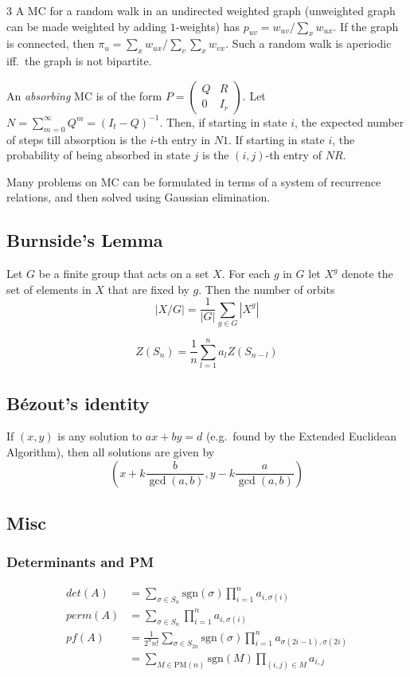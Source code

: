 \documentclass[a4paper, 8pt, landscape, oneside]{extarticle}
\begin{document}
\begin{multicols*}{3}
          A MC for a random walk in an undirected weighted graph (unweighted
          graph can be made weighted by adding $1$-weights) has $p_{uv} =
          w_{uv}/\sum_{x} w_{ux}$. If the graph is connected, then $\pi_u =
          \sum_{x} w_{ux} / \sum_{v}\sum_{x} w_{vx}$. Such a random walk is
          aperiodic iff.\ the graph is not bipartite.
      
          An \textit{absorbing} MC is of the form $P = \left(\begin{matrix} Q & R
          \\ 0 & I_r \end{matrix}\right)$. Let $N = \sum_{m=0}^\infty Q^m = (I_t
          - Q)^{-1}$. Then, if starting in state $i$, the expected number of
          steps till absorption is the $i$-th entry in $N1$. If starting in state
          $i$, the probability of being absorbed in state $j$ is the $(i,j)$-th
          entry of $NR$.
      
          Many problems on MC can be formulated in terms of a system of
          recurrence relations, and then solved using Gaussian elimination.
      
        \subsection{Burnside's Lemma}
          Let $G$ be a finite group that acts on a set $X$. For each $g$ in $G$
          let $X^g$ denote the set of elements in $X$ that are fixed by $g$. Then
          the number of orbits \[ |X/G| = \frac{1}{|G|} \sum_{g\in G} |X^g| \]
      
          \[
              Z(S_n) = \frac{1}{n} \sum_{l=1}^n a_l Z(S_{n-l})
          \]
      
        \subsection{Bézout's identity}
          If $(x,y)$ is any solution to $ax+by=d$ (e.g.\ found by the Extended
          Euclidean Algorithm), then all solutions are given by \[
          \left(x+k\frac{b}{\gcd(a,b)}, y-k\frac{a}{\gcd(a,b)}\right) \]
      
        \subsection{Misc}
          \subsubsection{Determinants and PM}
            \begin{align*}
              det(A) &= \sum_{\sigma \in S_n}\text{sgn}(\sigma)\prod_{i = 1}^n a_{i,\sigma(i)}\\
              perm(A) &= \sum_{\sigma \in S_n} \prod_{i = 1}^n a_{i,\sigma(i)}\\
              pf(A) &= \frac{1}{2^nn!}\sum_{\sigma \in S_{2n}} \text{sgn}(\sigma)\prod_{i = 1}^n a_{\sigma(2i-1),\sigma(2i)}\\ &= \sum_{M \in \text{PM}(n)} \text{sgn}(M) \prod_{(i,j) \in M} a_{i,j}
            \end{align*}
      

\end{multicols*}
\end{document}
